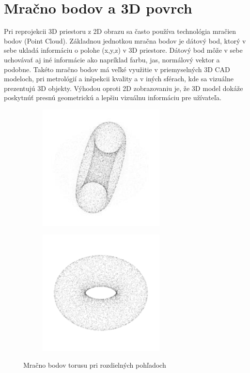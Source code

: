 \section{Mračno bodov a 3D povrch}

Pri reprojekcii 3D priestoru z 2D obrazu sa často používa technológia mračien bodov (Point Cloud). Základnou jednotkou mračna bodov je dátový bod, ktorý v sebe ukladá informáciu o polohe (x,y,z) v 3D priestore. Dátový bod môže v sebe uchovávať aj iné informácie ako napríklad farbu, jas, normálový vektor a podobne. Takéto mračno bodov má veľké využitie v priemyselných 3D CAD modeloch, pri metrológií a inšpekcii kvality a v iných sférach, kde sa vizuálne prezentujú 3D objekty. Výhodou oproti 2D zobrazovaniu je, že 3D model dokáže poskytnúť presnú geometrickú a lepšiu vizuálnu informáciu pre užívateľa.

\begin{figure}[!h]
	\centering
	\begin{subfigure}[b]{0.45\textwidth}
		\centering
		\includegraphics[width=0.7\textwidth]{figures/point_cloud_a.png}
		\caption{}
		\label{fig:point_cloud:a}
	\end{subfigure}
	\begin{subfigure}[b]{0.45\textwidth}
		\centering
		\includegraphics[width=0.7\textwidth]{figures/point_cloud_b.png}
		\caption{}
		\label{fig:point_cloud:b}
	\end{subfigure}
	\caption{Mračno bodov torusu pri rozdielných pohľadoch}
	\label{fig:point_cloud}
\end{figure}



